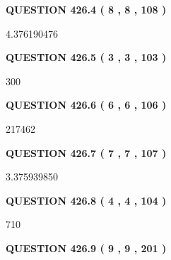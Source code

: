 \documentclass{ctexart}
\begin{document}
 
 
 
  
\vspace{0.2in}
  
{\textbf{\Large{QUESTION
426.4 
 ( 8 , 8 , 108 )
}}}
  
  
 
 
\noindent{}

4.376190476
 
 
  
\vspace{0.2in}
  
{\textbf{\Large{QUESTION
426.5 
 ( 3 , 3 , 103 )
}}}
  
  
 
 
\noindent{}

300
 
 
  
\vspace{0.2in}
  
{\textbf{\Large{QUESTION
426.6 
 ( 6 , 6 , 106 )
}}}
  
  
 
 
\noindent{}

217462
 
 
  
\vspace{0.2in}
  
{\textbf{\Large{QUESTION
426.7 
 ( 7 , 7 , 107 )
}}}
  
  
 
 
\noindent{}

3.375939850
 
 
  
\vspace{0.2in}
  
{\textbf{\Large{QUESTION
426.8 
 ( 4 , 4 , 104 )
}}}
  
  
 
 
\noindent{}

710
 
 
  
\vspace{0.2in}
  
{\textbf{\Large{QUESTION
426.9 
 ( 9 , 9 , 201 )
}}}
  
\end{document}
